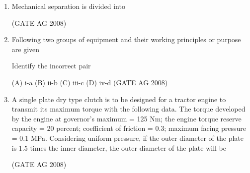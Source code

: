 \documentclass[journal]{IEEEtran}
\begin{document}
\begin{enumerate}
\medskip

\item 
 Mechanical separation is divided into
\begin{enumerate}
\end{enumerate}
\hfill(GATE AG 2008)\\

\medskip

\item 
 Following two groups of equipment and their working principles or purpose are given
 


\medskip

Identify the incorrect pair

(A) i-a \quad (B) ii-b \quad (C) iii-c \quad (D) iv-d
\hfill(GATE AG 2008)\\

\item 
 A single plate dry type clutch is to be designed for a tractor engine to transmit its maximum torque with the following data. The torque developed by the engine at governor's maximum = 125 Nm; the engine torque reserve capacity = 20 percent; coefficient of friction = 0.3; maximum facing pressure = 0.1 MPa. Considering uniform pressure, if the outer diameter of the plate is 1.5 times the inner diameter, the outer diameter of the plate will be
\begin{enumerate}
\end{enumerate}
\hfill(GATE AG 2008)\\

\medskip


\end{enumerate}
\end{document}

